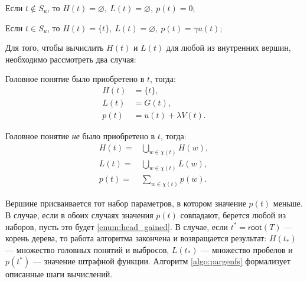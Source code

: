 \documentclass[12pt]{article}
\renewcommand{\emptyset}{\varnothing}
\newenvironment{itemize*}%
{\begin{itemize}%
	\setlength{\itemsep}{0pt}%
	\setlength{\parskip}{0pt}}%
{\end{itemize}}
\newenvironment{alphaenumerate*}
{\begin{enumerate}[label=(\asbuk*), ref=(\asbuk*)]
	\setlength{\itemsep}{0pt}
	\setlength{\parskip}{0pt}}
{\end{enumerate}}
\renewcommand{\cup}{\bigcup}
\begin{document}
\begin{itemize*}
	\item Если $t\notin S_u$, то $H(t)=\emptyset, \ L(t)=\emptyset,\ p(t)=0$;
	\item Если $t\in S_u$, то $H(t)=\{t\}, \ L(t)=\emptyset,\ p(t)=\gamma u(t)$;
\end{itemize*}

Для того, чтобы вычислить $H(t)$ и $L(t)$ для любой из внутренних вершин, необходимо рассмотреть два случая:
\begin{alphaenumerate*}
	\item\label{enum:head_gained} Головное понятие было приобретено в $t$, тогда:
	\begin{equation}
		\begin{aligned}
			H(t) &=\{t\},\\
			L(t)&=G(t), \\
			p(t)& = u(t) + \lambda V(t).
		\end{aligned}
	\end{equation}
	\item Головное понятие \emph{не} было приобретено в $t$, тогда:
	\begin{equation}
		\begin{aligned}
			H(t)=&\cup_{w\in \chi(t)} H(w),\\
			L(t)=&\cup_{w\in \chi(t)} L(w), \\
			p(t) =& \sum_{w\in \chi(t)}p(w).
		\end{aligned}
	\end{equation}
\end{alphaenumerate*}

Вершине присваивается тот набор параметров, в котором значение $p(t)$ меньше. В случае, если в обоих случаях значения $p(t)$ совпадают, берется любой из наборов, пусть это будет \ref{enum:head_gained}. В случае, если $t^*=\textsf{root}(T)$ --- корень дерева, то работа алгоритма закончена и возвращается результат: $H(t_*)$ --- множество головных понятий и выбросов, $L(t_*)$ --- множество пробелов и $p(t^*)$ --- значение штрафной функции. Алгоритм \ref{algo:pargenfs} формализует описанные шаги вычислений.
\end{document}
